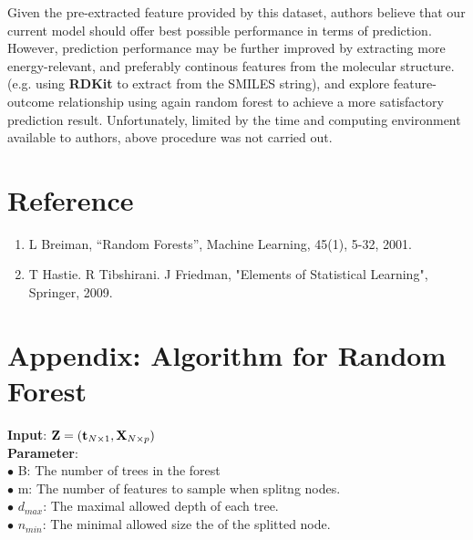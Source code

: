 \documentclass[11pt]{article}
\theoremstyle{definition}
\begin{document}
Given the pre-extracted feature provided by this dataset, authors believe that  our current model should offer best possible performance in terms of prediction. However, prediction performance may be further improved by extracting more energy-relevant, and preferably continous features from the molecular structure. (e.g. using \textbf{RDKit} to extract from the SMILES string), and explore feature-outcome relationship  using again random forest to achieve a more satisfactory prediction result. Unfortunately, limited by the time and computing environment available to authors, above procedure was not carried out.

\clearpage
\section*{\textbf{Reference}}
\begin{enumerate}
\item L Breiman, “Random Forests”, Machine Learning, 45(1), 5-32, 2001. 
\item T Hastie. R Tibshirani. J Friedman, "Elements of Statistical Learning", Springer, 2009.
\end{enumerate}


\section*{\textbf{Appendix: Algorithm for Random Forest}}
\textbf{Input}: ${\bf Z} = ({\bf t}_{N \times 1}, {\bf X}_{N \times p})$\\

\textbf{Parameter}:\\
$\bullet$ B: The number of trees in the forest\\
$\bullet$ m: The number of features to sample when splitng nodes.\\
$\bullet$ $d_{max}$: The maximal allowed depth of each tree. \\
$\bullet$ $n_{min}$: The minimal allowed size the of the splitted node.\\
\end{document}
